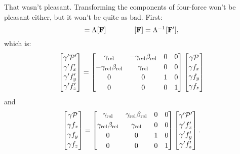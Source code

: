 \documentclass[12pt]{article}
\renewcommand{\vv}[1]{\mathbf{#1}}
\begin{document}
That wasn't pleasant. Transforming the components of four-force won't be pleasant either, but it won't be quite as bad. First:
\begin{equation*}
[\vv F^\prime] = \Lambda \mkern1mu [\vv F] \qquad \qquad [\vv F] = \Lambda^{-1} \mkern1mu [\vv F^\prime] ,
\end{equation*}
which is:
\begin{equation*}
\begin{bmatrix}
\gamma^\prime \mathcal{P}^\prime \\[.15 em]
\gamma^\prime f_x^\prime \\[.15 em]
\gamma^\prime f_y^\prime \\[.15 em]
\gamma^\prime f_z^\prime\\[.1 em]
\end{bmatrix}
=
\begin{bmatrix}
\gamma_{\textrm{rel}} & -\gamma_{\textrm{rel}} \mkern1mu \beta_{\textrm{rel}} & 0 & 0 \\[.25 em]
- \gamma_{\textrm{rel}} \mkern1mu \beta_{\textrm{rel}} & \gamma_{\textrm{rel}} & 0 & 0 \\[.25 em]
0 & 0 & 1 & 0 \\[.25 em]
0 & 0 & 0 & 1
\end{bmatrix}
\begin{bmatrix}
\gamma \mathcal{P} \\[.15 em]
\gamma f_x \\[.15 em]
\gamma f_y \\[.15 em]
\gamma f_z \\[.1 em]
\end{bmatrix}
\end{equation*}
and
\begin{equation*}
\begin{bmatrix}
\gamma \mathcal{P} \\[.15 em]
\gamma f_x \\[.15 em]
\gamma f_y \\[.15 em]
\gamma f_z \\[.1 em]
\end{bmatrix}
=
\begin{bmatrix}
\gamma_{\textrm{rel}} & \gamma_{\textrm{rel}} \mkern1mu \beta_{\textrm{rel}} & 0 & 0 \\[.25 em]
\gamma_{\textrm{rel}} \mkern1mu \beta_{\textrm{rel}} & \gamma_{\textrm{rel}} & 0 & 0 \\[.25 em]
0 & 0 & 1 & 0 \\[.25 em]
0 & 0 & 0 & 1
\end{bmatrix}
\begin{bmatrix}
\gamma^\prime \mathcal{P}^\prime \\[.15 em]
\gamma^\prime f_x^\prime \\[.15 em]
\gamma^\prime f_y^\prime \\[.15 em]
\gamma^\prime f_z^\prime\\[.1 em]
\end{bmatrix} .
\end{equation*}
\end{document}
